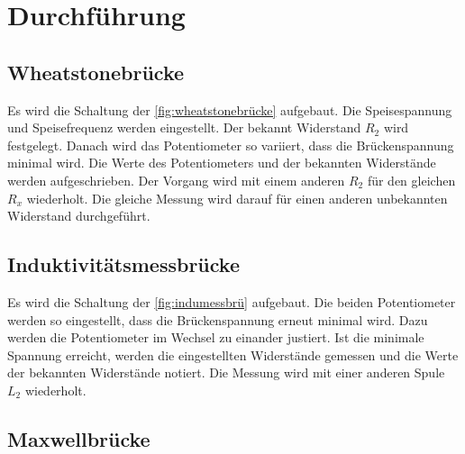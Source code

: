 \section{Durchführung}
\label{sec:Durchführung}
\subsection{Wheatstonebrücke}

Es wird die Schaltung der \autoref{fig:wheatstonebrücke} aufgebaut. Die Speisespannung und Speisefrequenz werden eingestellt.
Der bekannt Widerstand $R_2$ wird festgelegt. Danach wird das Potentiometer so variiert, dass die Brückenspannung minimal wird.
Die Werte des Potentiometers und der bekannten Widerstände werden aufgeschrieben.
Der Vorgang wird mit einem anderen $R_2$ für den gleichen $R_x$ wiederholt.
Die gleiche Messung wird darauf für einen anderen unbekannten Widerstand durchgeführt.

\subsection{Induktivitätsmessbrücke}
Es wird die Schaltung der \autoref{fig:indumessbrü} aufgebaut. Die beiden Potentiometer werden so eingestellt, dass die Brückenspannung erneut minimal wird. Dazu werden die Potentiometer im Wechsel zu einander justiert.
Ist die minimale Spannung erreicht, werden die eingestellten Widerstände gemessen und die Werte der bekannten Widerstände notiert.
Die Messung wird mit einer anderen Spule $L_2$ wiederholt.

\subsection{Maxwellbrücke}
